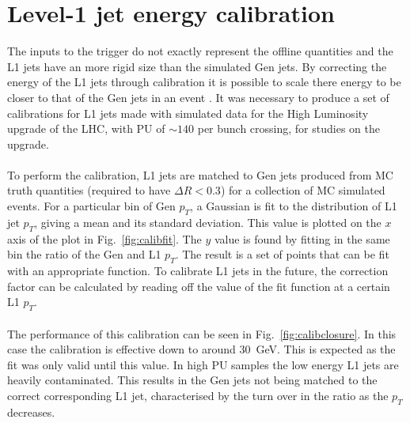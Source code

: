 \section{Level-1 jet energy calibration}
\label{sec:l1jec}


The inputs to the trigger do not exactly represent the offline quantities and the L1 jets have an more rigid size than the simulated Gen jets. By correcting the energy of the L1 jets through calibration it is possible to scale there energy to be closer to that of the Gen jets in an event \cite{l1jet-calibration}. It was necessary to produce a set of calibrations for L1 jets made with simulated data for the High Luminosity upgrade of the LHC, with PU of $\sim140$ per bunch crossing, for studies on the upgrade.
\\\\
To perform the calibration, L1 jets are matched to Gen jets produced from MC truth quantities (required to have $\Delta R<0.3$) for a collection of MC simulated events. For a particular bin of Gen $p_T$, a Gaussian is fit to the distribution of L1 jet $p_T$, giving a mean and its standard deviation. This value is plotted on the $x$ axis of the plot in Fig.~\ref{fig:calibfit}. The $y$ value is found by fitting in the same bin the ratio of the Gen and L1 $p_T$. The result is a set of points that can be fit with an appropriate function. To calibrate L1 jets in the future, the correction factor can be calculated by reading off the value of the fit function at a certain L1 $p_T$. 
\\\\
The performance of this calibration can be seen in Fig.~\ref{fig:calibclosure}. In this case the calibration is effective down to around $30$~GeV. This is expected as the fit was only valid until this value. In high PU samples the low energy L1 jets are heavily contaminated. This results in the Gen jets not being matched to the correct corresponding L1 jet, characterised by the turn over in the ratio as the $p_T$ decreases.

